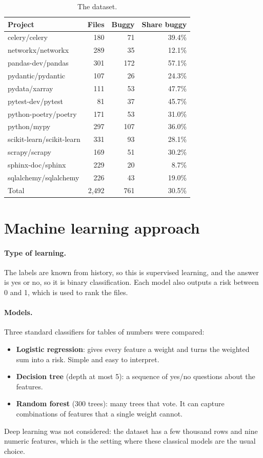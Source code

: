 \documentclass[11pt,a4paper]{article}
\begin{document}
\begin{table}[h]
\centering
\begin{tabular}{lrrr}
\toprule
Project & Files & Buggy & Share buggy \\
\midrule
celery/celery & 180 & 71 & 39.4\% \\
networkx/networkx & 289 & 35 & 12.1\% \\
pandas-dev/pandas & 301 & 172 & 57.1\% \\
pydantic/pydantic & 107 & 26 & 24.3\% \\
pydata/xarray & 111 & 53 & 47.7\% \\
pytest-dev/pytest & 81 & 37 & 45.7\% \\
python-poetry/poetry & 171 & 53 & 31.0\% \\
python/mypy & 297 & 107 & 36.0\% \\
scikit-learn/scikit-learn & 331 & 93 & 28.1\% \\
scrapy/scrapy & 169 & 51 & 30.2\% \\
sphinx-doc/sphinx & 229 & 20 & 8.7\% \\
sqlalchemy/sqlalchemy & 226 & 43 & 19.0\% \\
\midrule
Total & 2,492 & 761 & 30.5\% \\
\bottomrule
\end{tabular}
\caption{The dataset.}
\label{tab:data}
\end{table}

\section{Machine learning approach}

\paragraph{Type of learning.} The labels are known from history, so this is
supervised learning, and the answer is yes or no, so it is binary
classification. Each model also outputs a risk between 0 and 1, which is used
to rank the files.

\paragraph{Models.} Three standard classifiers for tables of numbers were
compared:
\begin{itemize}
\item \textbf{Logistic regression}: gives every feature a weight and turns the
      weighted sum into a risk. Simple and easy to interpret.
\item \textbf{Decision tree} (depth at most 5): a sequence of yes/no questions
      about the features.
\item \textbf{Random forest} (300 trees): many trees that vote. It can
      capture combinations of features that a single weight cannot.
\end{itemize}
Deep learning was not considered: the dataset has a few thousand rows and nine
numeric features, which is the setting where these classical models are the
usual choice.
\end{document}

